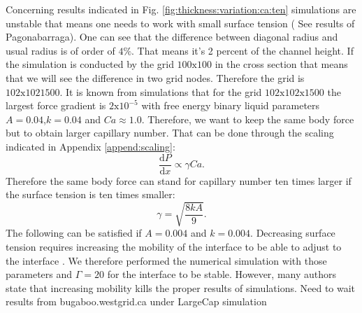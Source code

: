 \documentclass{article}
\begin{document}
Concerning results indicated in Fig.
\ref{fig:thickness:variation:ca:ten} simulations are unstable that means one needs to work with
small surface tension ({\color{red} See results of Pagonabarraga}). One can see that the difference
between diagonal radius and
usual radius is of order of $4\%$. That means it's 2 percent of the channel height. If the
simulation is conducted by the grid $100\mathrm{x}100$ in the cross section that means that we will
see the difference in two grid nodes. Therefore the grid is $102\mathrm{x}102\mathrm{1500}$. It is
known from simulations that for the grid $102\mathrm{x}102\mathrm{x}1500$ the largest force gradient
is $2\mathrm{x}10^{-5}$ with free energy binary liquid parameters $A=0.04$,$k=0.04$ and $Ca\approx
1.0$. Therefore, we want to keep the same body force but to obtain larger capillary number. That
can be done through the scaling indicated in Appendix \ref{append:scaling}:
\begin{equation}
\frac{\mathrm{d}P}{\mathrm{d}x}\propto \gamma Ca .
\end{equation}
Therefore the same body force can stand for capillary number ten times larger if the surface
tension is ten times smaller:
\begin{equation}
\gamma=\sqrt{\frac{8 k A}{9}}.
\end{equation}
The following can be satisfied if $A=0.004$ and $k=0.004$. Decreasing surface tension requires
increasing the mobility of the interface to be able to adjust to the interface
\cite{pagonabarraga-parameters}. We therefore performed the numerical simulation with those
parameters and $\Gamma=20$ for the interface to be stable. 
{\color{red} However, many authors state that increasing mobility kills
the
proper results of simulations}.
{\color{red} Need to wait results from bugaboo.westgrid.ca under LargeCap simulation}
\end{document}
